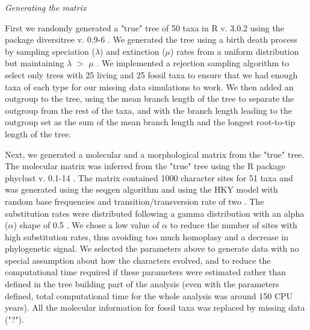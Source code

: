 \documentclass[12pt,letterpaper]{article}
\renewcommand{\subsection}[1]{%
\bigskip
\begin{center}
\begin{large}
\normalfont\itshape #1
\end{large}
\end{center}}
\begin{document}

\subsection{Generating the matrix} %
First we randomly generated a "true" tree of 50 taxa in R v. 3.0.2 \citep{R302} using the package diversitree v. 0.9-6 \citep{fitzjohndiversitree2012}. We generated the tree using a birth death process by sampling speciation ($\lambda$) and extinction ($\mu$) rates from a uniform distribution but maintaining $\lambda$ $>$ $\mu$ \citep{paradistime-dependent2011}. We implemented a rejection sampling algorithm to select only trees with 25 living and 25 fossil taxa to ensure that we had enough taxa of each type for our missing data simulations to work. We then added an outgroup to the tree, using the mean branch length of the tree to separate the outgroup from the rest of the taxa, and with the branch length leading to the outgroup set as the sum of the mean branch length and the longest root-to-tip length of the tree.

Next, we generated a molecular and a morphological matrix from the "true" tree. The molecular matrix was inferred from the "true" tree using the R package phyclust v. 0.1-14 \citep{chen2011}. The matrix contained 1000 character sites for 51 taxa and was generated using the seqgen algorithm \citep{ranbaut1997seqgen} and using the HKY model \citep{HKY85} with random base frequencies and transition/transversion rate of two \citep{douadycomparison2003}. The substitution rates were distributed following a gamma distribution with an alpha ($\alpha$) shape of 0.5 \citep{yangamong-site1996}. We chose a low value of $\alpha$ to reduce the number of sites with high substitution rates, thus avoiding too much homoplasy and a decrease in phylogenetic signal. We selected the parameters above to generate data with no special assumption about how the characters evolved, and to reduce the computational time required if these parameters were estimated rather than defined in the tree building part of the analysis (even with the parameters defined, total computational time for the whole analysis was around 150 CPU years). All the molecular information for fossil taxa was replaced by missing data ("?").
\end{document}
